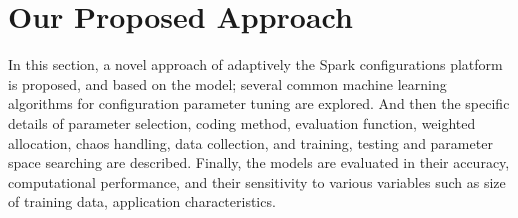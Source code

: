 \section{Our Proposed Approach}\label{sec:approach}
\par In this section, a novel approach of adaptively the Spark configurations platform is proposed, and based on the model; several common machine learning algorithms for configuration parameter tuning are explored. And then the specific details of parameter selection, coding method, evaluation function, weighted allocation, chaos handling, data collection, and training, testing and parameter space searching are described. Finally, the models are evaluated in their accuracy, computational performance, and their sensitivity to various variables such as size of training data, application characteristics.

